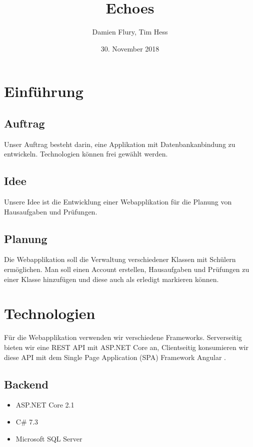 \documentclass[a4paper, titlepage]{article}
\title{Echoes}
\author{Damien Flury, Tim Hess}
\date{30. November 2018}
\begin{document}
    \maketitle
    \tableofcontents
    \newpage

    \section{Einführung}
    \subsection{Auftrag}
    Unser Auftrag besteht darin, eine Applikation mit Datenbankanbindung zu entwickeln. Technologien
    können frei gewählt werden.
    \subsection{Idee}
    Unsere Idee ist die Entwicklung einer Webapplikation für die Planung von Hausaufgaben
    und Prüfungen. 
    \subsection{Planung}
    Die Webapplikation soll die Verwaltung verschiedener Klassen mit Schülern ermöglichen.
    Man soll einen Account erstellen, Hausaufgaben und Prüfungen zu einer Klasse hinzufügen
    und diese auch als erledigt markieren können.
    \section{Technologien}
    Für die Webapplikation verwenden wir verschiedene Frameworks. Serverseitig bieten wir
    eine REST API mit ASP.NET Core \cite{Dotnet} an, Clientseitig konsumieren wir diese API mit dem Single
    Page Application (SPA) Framework Angular \cite{Angular}.
    \subsection{Backend}
    \begin{itemize}
        \item ASP.NET Core 2.1
        \item C\# 7.3
        \item Microsoft SQL Server
    \end{itemize}
\end{document}
